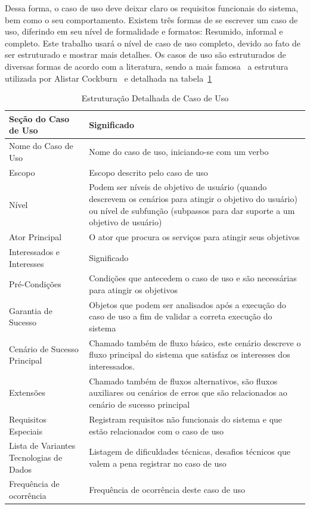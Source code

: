 Dessa forma, o caso de uso deve deixar claro os requisitos funcionais do sistema, bem como o seu comportamento. Existem três formas de se escrever um caso de uso, diferindo em seu nível de formalidade e formatos: Resumido, informal e completo. Este trabalho usará o nível de caso de uso completo, devido ao fato de ser estruturado e mostrar mais detalhes. Os casos de uso são estruturados de diversas formas de acordo com a literatura, sendo a mais famosa~\cite{larman08} a estrutura utilizada por Alistar Cockburn~\cite{cockburn01} e detalhada na tabela~\ref{tabela:topicos_uc}

\begin{table}
	\caption{Estruturação Detalhada de Caso de Uso}
	\begin{tabular}{|p{5cm} | p{9cm}|}
		\hline
		\textbf{Seção do Caso de Uso}	& \textbf{Significado} \\
		\hline
		Nome do Caso de Uso 	& Nome do caso de uso, iniciando-se com um verbo  \\
		\hline
		Escopo	& Escopo descrito pelo caso de uso \\
		\hline
		Nível	& Podem ser níveis de objetivo de usuário (quando descrevem os cenários para atingir o objetivo do usuário) ou nível de subfunção (subpassos para dar suporte a um objetivo de usuário) \\
		\hline
		Ator Principal	& O ator que procura os serviços para atingir seus objetivos  \\
		\hline
		Interessados e Interesses	& Significado  \\
		\hline
		Pré-Condições	& Condições que antecedem o caso de uso e são necessárias para atingir os objetivos \\
		\hline
		Garantia de Sucesso	& Objetos que podem ser analisados após a execução do caso de uso a fim de validar a correta execução do sistema  \\
		\hline
		Cenário de Sucesso Principal	& Chamado também de fluxo básico, este cenário descreve o fluxo principal do sistema que satisfaz os interesses dos interessados.  \\
		\hline
		Extensões	& Chamado também de fluxos alternativos, são fluxos auxiliares ou cenários de erros que são relacionados ao cenário de sucesso principal \\
		\hline
		Requisitos Especiais	& Registram requisitos não funcionais do sistema e que estão relacionados com o caso de uso \\
		\hline
		Lista de Variantes Tecnologias de Dados	& Listagem de dificuldades técnicas, desafios técnicos que valem a pena registrar no caso de uso \\
		\hline
		Frequência de ocorrência	& Frequência de ocorrência deste caso de uso \\
		\hline
	\end{tabular}
	\label{tabela:topicos_uc}
\end{table}

